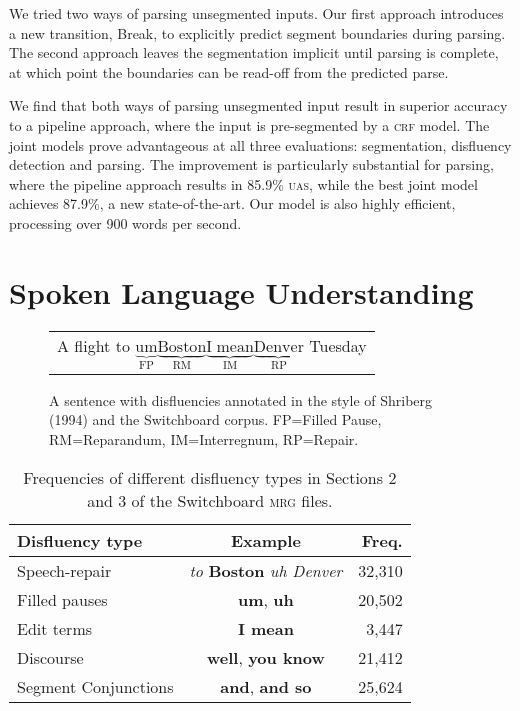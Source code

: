 \documentclass[11pt,letterpaper]{article}
\begin{document}
We tried two ways of parsing unsegmented inputs.  Our first approach introduces
a new transition, Break, to explicitly predict segment boundaries during parsing.
The second approach leaves the segmentation implicit until
parsing is complete, at which point the boundaries can be read-off from the
predicted parse.

We find that both ways of parsing unsegmented input result in superior accuracy
to a pipeline approach, where the input is pre-segmented by a \textsc{crf} model.
The joint models prove advantageous at all three evaluations: segmentation,
disfluency detection and parsing.
The improvement is particularly substantial for parsing, where the
pipeline approach results in 85.9\% \textsc{uas}, while the best joint model
achieves 87.9\%, a new state-of-the-art.  
Our model is also highly efficient, processing over 900 words per second.


\section{Spoken Language Understanding}

\begin{figure}
    \begin{tabular}{l}
        \small

        A flight to $\underbrace{\mathrm{um}}_\text{FP} \underbrace{\mathrm{Boston}}_\text{RM} \underbrace{\mathrm{I\;mean}}_\text{IM} \underbrace{\mathrm{Denver}}_\text{RP}$ Tuesday\\

\end{tabular}
\caption{\small A sentence with disfluencies annotated in the style of Shriberg (1994) 
    and the Switchboard corpus.
FP=Filled Pause, RM=Reparandum, IM=Interregnum, RP=Repair.
\label{fig:shriberg}}
\end{figure}

\begin{table}
    \centering
    \small
    \begin{tabular}{lc|r}
\hline
Disfluency type & Example & Freq. \\
\hline \hline
Speech-repair & \emph{to } \textbf{Boston} \emph{uh Denver} & 32,310 \\
Filled pauses    & \textbf{um}, \textbf{uh} & 20,502 \\
Edit terms & \textbf{I mean} & 3,447 \\ 
Discourse  & \textbf{well}, \textbf{you know} & 21,412  \\
Segment Conjunctions & \textbf{and}, \textbf{and so} & 25,624 \\
\hline
\end{tabular}
\caption{\small Frequencies of different disfluency types in Sections 2 and 3 of the
Switchboard \textsc{mrg} files.\label{tab:dfl_freqs}}
\vspace*{-4em}
\end{table}
\end{document}
